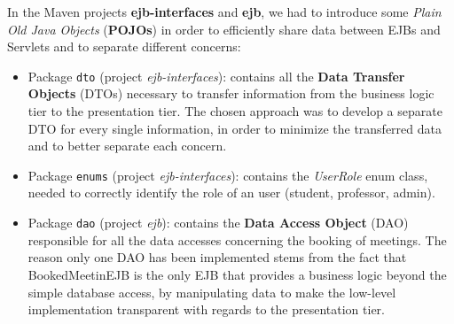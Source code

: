 In the Maven projects \textbf{ejb-interfaces} and \textbf{ejb}, we had to introduce some \textit{Plain Old Java Objects} (\textbf{POJOs}) in order to efficiently share data between EJBs and Servlets and to separate different concerns:

\begin{itemize}
    \item Package \texttt{dto} (project \textit{ejb-interfaces}): contains all the \textbf{Data Transfer Objects} (DTOs) necessary to transfer information from the business logic tier to the presentation tier. The chosen approach was to develop a separate DTO for every single information, in order to minimize the transferred data and to better separate each concern.
    
    \item Package \texttt{enums} (project \textit{ejb-interfaces}): contains the \textit{UserRole} enum class, needed to correctly identify the role of an user (student, professor, admin).
    
    \item Package \texttt{dao} (project \textit{ejb}): contains the \textbf{Data Access Object} (DAO) responsible for all the data accesses concerning the booking of meetings. The reason only one DAO has been implemented stems from the fact that BookedMeetinEJB is the only EJB that provides a business logic beyond the simple database access, by manipulating data to make the low-level implementation transparent with regards to the presentation tier. 
\end{itemize}
